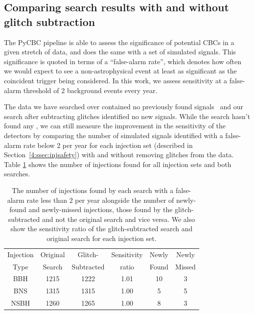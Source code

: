 \subsection{Comparing search results with and without glitch subtraction}

The PyCBC pipeline is able to assess the significance of potential CBCs in a given stretch of data, and does the same with a set of simulated signals. This significance is quoted in terms of a ``false-alarm rate'', which denotes how often we would expect to see a non-astrophysical event at least as significant as the coincident trigger being considered. In this work, we assess sensitivity at a false-alarm threshold of 2 background events every year.

The data we have searched over contained no previously found \gwadj signals~\cite{gwtc3:2023} and our search after subtracting \scladj glitches identified no new \gwadj signals. While the search hasn't found any \gws, we can still measure the improvement in the sensitivity of the detectors by comparing the number of simulated signals identified with a false-alarm rate below 2 per year for each injection set (described in Section~\ref{4:ssec:injsafety}) with and without removing glitches from the data. Table \ref{4:tab:found_injs} shows the number of injections found for all injection sets and both searches.
%
\begin{table}[tb]
\centering
\caption{\label{4:tab:found_injs}The number of injections found by each search with a false-alarm rate less than 2 per year alongside the number of newly-found and newly-missed injections, those found by the glitch-subtracted and not the original search and vice versa. We also show the sensitivity ratio of the glitch-subtracted search and original search for each injection set.} 
\footnotesize
\renewcommand{\arraystretch}{1.2}
\begin{tabular}{@{}cccccc}
\hline
Injection & Original  & Glitch- & Sensitivity & Newly & Newly \\
Type & Search & Subtracted & ratio & Found & Missed \\
\hline
BBH & 1215 & 1222 & 1.01 & 10 & 3 \\
BNS & 1315 & 1315 & 1.00 & 5 & 5 \\
NSBH & 1260 & 1265 & 1.00 & 8 & 3 \\
\hline
\end{tabular}


\end{table}


